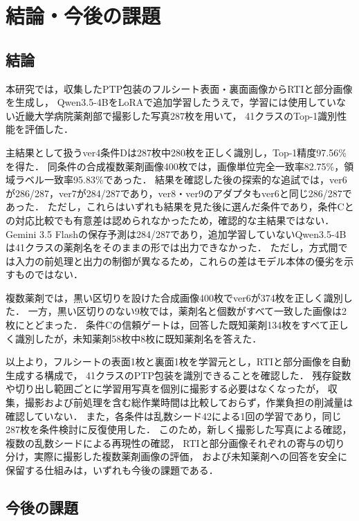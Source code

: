 \documentclass[uplatex,dvipdfmx]{jsarticle}
\begin{document}
\clearpage
\section{結論・今後の課題}\label{sec:conclusion}

\subsection{結論}

本研究では，収集したPTP包装のフルシート表面・裏面画像からRTIと部分画像を生成し，
Qwen3.5-4BをLoRAで追加学習したうえで，学習には使用していない近畿大学病院薬剤部で撮影した写真287枚を用いて，
41クラスのTop-1識別性能を評価した．

主結果として扱うver4条件Dは287枚中280枚を正しく識別し，Top-1精度97.56\%を得た．
同条件の合成複数薬剤画像400枚では，画像単位完全一致率82.75\%，領域ラベル一致率95.83\%であった．
結果を確認した後の探索的な追試では，ver6が286/287，ver7が284/287であり，ver8・ver9のアダプタもver6と同じ286/287であった．
ただし，これらはいずれも結果を見た後に選んだ条件であり，条件Cとの対応比較でも有意差は認められなかったため，確認的な主結果ではない．
Gemini 3.5 Flashの保存予測は284/287であり，追加学習していないQwen3.5-4Bは41クラスの薬剤名をそのままの形では出力できなかった．
ただし，方式間では入力の前処理と出力の制御が異なるため，これらの差はモデル本体の優劣を示すものではない．

複数薬剤では，黒い区切りを設けた合成画像400枚でver6が374枚を正しく識別した．
一方，黒い区切りのない9枚では，薬剤名と個数がすべて一致した画像は2枚にとどまった．
条件Cの信頼ゲートは，回答した既知薬剤134枚をすべて正しく識別したが，未知薬剤58枚中8枚に既知薬剤名を答えた．

以上より，フルシートの表面1枚と裏面1枚を学習元とし，RTIと部分画像を自動生成する構成で，
41クラスのPTP包装を識別できることを確認した．
残存錠数や切り出し範囲ごとに学習用写真を個別に撮影する必要はなくなったが，
収集，撮影および前処理を含む総作業時間は比較しておらず，作業負担の削減量は確認していない．
また，各条件は乱数シード42による1回の学習であり，同じ287枚を条件検討に反復使用した．
このため，新しく撮影した写真による確認，複数の乱数シードによる再現性の確認，
RTIと部分画像それぞれの寄与の切り分け，実際に撮影した複数薬剤画像の評価，
および未知薬剤への回答を安全に保留する仕組みは，いずれも今後の課題である．

\subsection{今後の課題}
\end{document}
